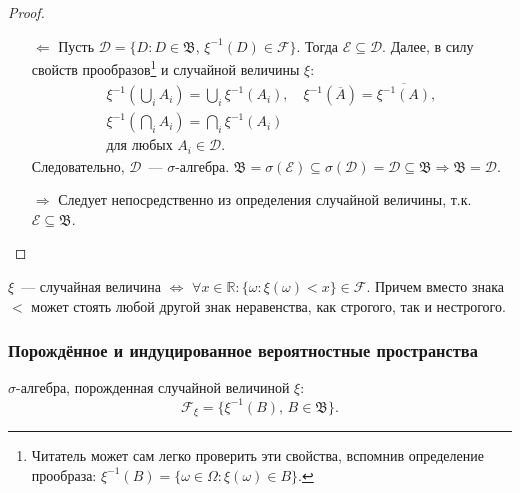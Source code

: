 \begin{proof}
    \begin{itemize}
        \item[$\Leftarrow$] Пусть $\mathcal{D} = \{D \colon D \in \mathfrak{B}, \, \xi^{-1}(D) \in \mathcal{F} \}$. Тогда $\mathcal{E} \subseteq \mathcal{D}$. Далее, в силу свойств прообразов\footnote{Читатель может сам легко проверить эти свойства, вспомнив определение прообраза: ${\xi^{-1}(B) = \{\omega \in \Omega \colon \xi(\omega) \in B\}}$.} и случайной величины $\xi$:
    \begin{gather*}
        \xi^{-1}\left(\bigcup\limits_i A_i\right) 
        = \bigcup\limits_i \xi^{-1}(A_i), \quad
        \xi^{-1}(\overline{A}) 
        = \overline{\xi^{-1}(A)}, \\
        \xi^{-1}\left(\bigcap\limits_i A_i\right) = \bigcap\limits_i \xi^{-1}(A_i) \\
        \text{для любых } A_i \in \mathcal{D}.
    \end{gather*}
    Следовательно, $\mathcal{D}$~--- ${\sigma \text{-алгебра}}$. $\mathfrak{B} = \sigma(\mathcal{E}) \subseteq \sigma(\mathcal{D}) = \mathcal{D} \subseteq \mathfrak{B} \Rightarrow \mathfrak{B} = \mathcal{D}.$
    
    \item[$\Rightarrow$] Следует непосредственно из определения случайной величины, т.к. ${\mathcal{E} \subseteq \mathfrak{B}}$.
    \end{itemize}
\end{proof}

\begin{crlr}
    $\xi$~--- случайная величина $\Leftrightarrow$ $\forall x \in \mathbb{R} \colon \{\omega \colon \xi(\omega) < x \} \in \mathcal{F}$. 
    Причем вместо знака $<$ может стоять любой другой знак неравенства, как строгого, так и нестрогого.
\end{crlr}

\subsubsection{Порождённое и индуцированное вероятностные пространства}
\begin{defn}
    $\sigma\text{-алгебра}$, порожденная случайной величиной $\xi$:
    \begin{equation*}
        \mathcal{F}_\xi = \{\xi^{-1}(B), \, B \in \mathfrak{B} \}.
    \end{equation*}
\end{defn}

